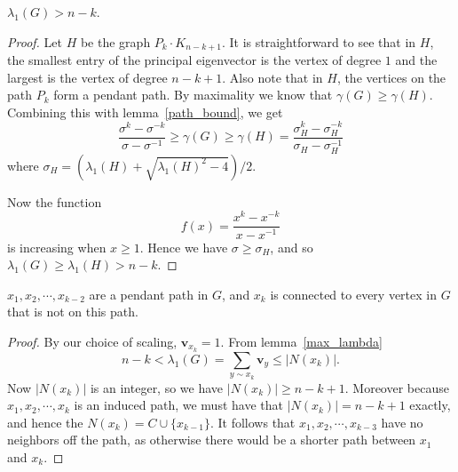 \begin{lemma}\label{max_lambda}
  $\lambda_1(G) > n-k$.
\end{lemma}
\begin{proof}
  Let $H$ be the graph $P_k \cdot K_{n-k+1}$. It is straightforward to see that in $H$, the smallest entry of the principal eigenvector is the vertex of degree $1$ and the largest is the vertex of degree $n-k+1$. Also note that in $H$, the vertices on the path $P_k$ form a pendant path.
  By maximality we know that $\gamma(G) \geq \gamma(H)$.
  Combining this with lemma~\ref{path_bound}, we get
   \[ \frac{\sigma^k - \sigma^{-k}}{\sigma - \sigma^{-1}} \geq \gamma(G) \geq \gamma(H) =  \frac{\sigma_H^{k} - \sigma_H^{-k}}{\sigma_H - \sigma_H^{-1}} \]
  where $\sigma_H = \left(\lambda_1(H) + \sqrt{\lambda_1(H)^2 - 4}\right) /2$.

  \noindent Now the function
   \[ f(x) = \frac{x^k - x^{-k}}{x - x^{-1}}\]
  is increasing when $x \geq 1$.
  Hence we have
  $\sigma \geq \sigma_H$, and so
  $\lambda_1(G) \geq \lambda_1(H) > n-k$.
\end{proof}

\begin{lemma}\label{connect_every}
  $x_1, x_2, \cdots, x_{k-2}$ are a pendant path in $G$, and $x_k$
  is connected to every vertex in $G$ that is not on this
  path.
\end{lemma}
\begin{proof}
  By our choice of scaling, $\mathbf{v}_{x_k} = 1$.  From lemma~\ref{max_lambda}
   \[ n-k < \lambda_1(G) = \sum_{y \sim  x_k} \mathbf{v}_{y} \leq |N(x_k)|. \]
  Now $|N(x_k)|$ is an integer, so we have $|N(x_k)| \geq n-k+1$.
  Moreover because $x_1, x_2, \cdots, x_k$ is an induced path, we
  must have that $|N(x_k)| = n-k+1$ exactly, and hence the
  $N(x_k) = C \cup \{ x_{k-1} \}$.  It follows that $x_1, x_2, \cdots, x_{k-3}$
  have no neighbors off the path, as otherwise there would be a shorter
  path between $x_1$ and $x_k$.
\end{proof}

